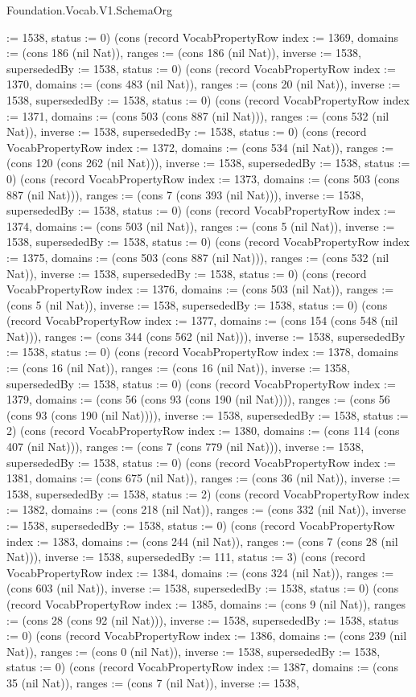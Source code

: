 \begin{lexlean}{Foundation.Vocab.V1.SchemaOrg}
\begin{semanticmodule}
{:= 1538, status := 0}) (cons (record VocabPropertyRow {index := 1369, domains := (cons 186 (nil Nat)), ranges := (cons 186 (nil Nat)), inverse := 1538, supersededBy := 1538, status := 0}) (cons (record VocabPropertyRow {index := 1370, domains := (cons 483 (nil Nat)), ranges := (cons 20 (nil Nat)), inverse := 1538, supersededBy := 1538, status := 0}) (cons (record VocabPropertyRow {index := 1371, domains := (cons 503 (cons 887 (nil Nat))), ranges := (cons 532 (nil Nat)), inverse := 1538, supersededBy := 1538, status := 0}) (cons (record VocabPropertyRow {index := 1372, domains := (cons 534 (nil Nat)), ranges := (cons 120 (cons 262 (nil Nat))), inverse := 1538, supersededBy := 1538, status := 0}) (cons (record VocabPropertyRow {index := 1373, domains := (cons 503 (cons 887 (nil Nat))), ranges := (cons 7 (cons 393 (nil Nat))), inverse := 1538, supersededBy := 1538, status := 0}) (cons (record VocabPropertyRow {index := 1374, domains := (cons 503 (nil Nat)), ranges := (cons 5 (nil Nat)), inverse := 1538, supersededBy := 1538, status := 0}) (cons (record VocabPropertyRow {index := 1375, domains := (cons 503 (cons 887 (nil Nat))), ranges := (cons 532 (nil Nat)), inverse := 1538, supersededBy := 1538, status := 0}) (cons (record VocabPropertyRow {index := 1376, domains := (cons 503 (nil Nat)), ranges := (cons 5 (nil Nat)), inverse := 1538, supersededBy := 1538, status := 0}) (cons (record VocabPropertyRow {index := 1377, domains := (cons 154 (cons 548 (nil Nat))), ranges := (cons 344 (cons 562 (nil Nat))), inverse := 1538, supersededBy := 1538, status := 0}) (cons (record VocabPropertyRow {index := 1378, domains := (cons 16 (nil Nat)), ranges := (cons 16 (nil Nat)), inverse := 1358, supersededBy := 1538, status := 0}) (cons (record VocabPropertyRow {index := 1379, domains := (cons 56 (cons 93 (cons 190 (nil Nat)))), ranges := (cons 56 (cons 93 (cons 190 (nil Nat)))), inverse := 1538, supersededBy := 1538, status := 2}) (cons (record VocabPropertyRow {index := 1380, domains := (cons 114 (cons 407 (nil Nat))), ranges := (cons 7 (cons 779 (nil Nat))), inverse := 1538, supersededBy := 1538, status := 0}) (cons (record VocabPropertyRow {index := 1381, domains := (cons 675 (nil Nat)), ranges := (cons 36 (nil Nat)), inverse := 1538, supersededBy := 1538, status := 2}) (cons (record VocabPropertyRow {index := 1382, domains := (cons 218 (nil Nat)), ranges := (cons 332 (nil Nat)), inverse := 1538, supersededBy := 1538, status := 0}) (cons (record VocabPropertyRow {index := 1383, domains := (cons 244 (nil Nat)), ranges := (cons 7 (cons 28 (nil Nat))), inverse := 1538, supersededBy := 111, status := 3}) (cons (record VocabPropertyRow {index := 1384, domains := (cons 324 (nil Nat)), ranges := (cons 603 (nil Nat)), inverse := 1538, supersededBy := 1538, status := 0}) (cons (record VocabPropertyRow {index := 1385, domains := (cons 9 (nil Nat)), ranges := (cons 28 (cons 92 (nil Nat))), inverse := 1538, supersededBy := 1538, status := 0}) (cons (record VocabPropertyRow {index := 1386, domains := (cons 239 (nil Nat)), ranges := (cons 0 (nil Nat)), inverse := 1538, supersededBy := 1538, status := 0}) (cons (record VocabPropertyRow {index := 1387, domains := (cons 35 (nil Nat)), ranges := (cons 7 (nil Nat)), inverse := 1538, }
\end{semanticmodule}
\end{lexlean}
